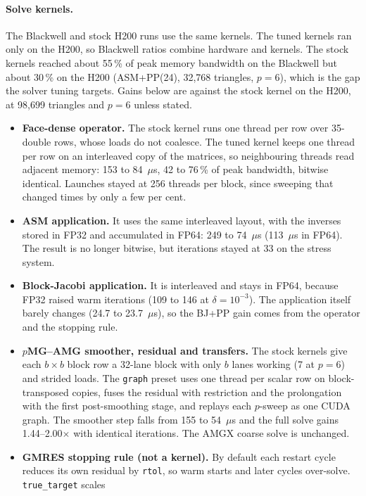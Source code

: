 \documentclass[10pt,a4paper]{article}
\begin{document}
\paragraph{Solve kernels.}
The Blackwell and stock H200 runs use the same kernels. The tuned kernels ran only on the H200, so
Blackwell ratios combine hardware and kernels. The stock kernels reached about 55\,\% of peak memory
bandwidth on the Blackwell but about 30\,\% on the H200 (ASM+PP(24), 32{,}768 triangles, $p=6$),
which is the gap the solver tuning targets. Gains below are against the stock kernel on the H200,
at 98{,}699 triangles and $p=6$ unless stated.
\begin{itemize}
\item \textbf{Face-dense operator.} The stock kernel runs one thread per row over 35-double rows,
  whose loads do not coalesce. The tuned kernel keeps one thread per row on an interleaved copy of
  the matrices, so neighbouring threads read adjacent memory: 153 to 84~$\mu$s, 42 to 76\,\% of peak
  bandwidth, bitwise identical. Launches stayed at 256 threads per block, since sweeping that
  changed times by only a few per cent.
\item \textbf{ASM application.} It uses the same interleaved layout, with the inverses stored in
  FP32 and accumulated in FP64: 249 to 74~$\mu$s (113~$\mu$s in FP64). The result is no longer
  bitwise, but iterations stayed at 33 on the stress system.
\item \textbf{Block-Jacobi application.} It is interleaved and stays in FP64, because FP32 raised
  warm iterations (109 to 146 at $\delta=10^{-3}$). The application itself barely changes (24.7 to
  23.7~$\mu$s), so the BJ+PP gain comes from the operator and the stopping rule.
\item \textbf{$p$MG--AMG smoother, residual and transfers.} The stock kernels give each $b\times b$
  block row a 32-lane block with only $b$ lanes working (7 at $p=6$) and strided loads. The
  \texttt{graph} preset uses one thread per scalar row on block-transposed copies, fuses the residual
  with restriction and the prolongation with the first post-smoothing stage, and replays each
  $p$-sweep as one CUDA graph. The smoother step falls from 155 to 54~$\mu$s and the full solve gains
  1.44--2.00$\times$ with identical iterations. The AMGX coarse solve is unchanged.
\item \textbf{GMRES stopping rule (not a kernel).} By default each restart cycle reduces its own
  residual by \texttt{rtol}, so warm starts and later cycles over-solve. \texttt{true\_target} scales

\end{itemize}
\end{document}
